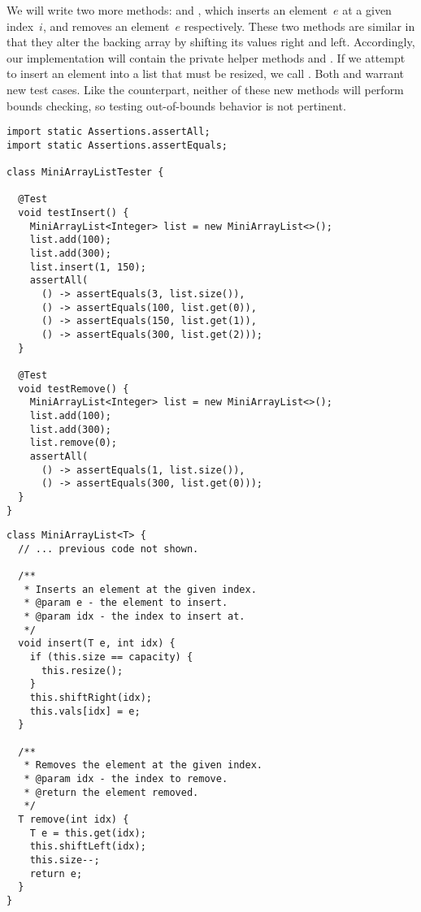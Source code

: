 We will write two more methods:  and , which inserts an element~$e$ at a given index~$i$, and removes an element~$e$ respectively. 
These two methods are similar in that they alter the backing array by shifting its values right and left. 
Accordingly, our implementation will contain the private helper methods  and . 
If we attempt to insert an element into a list that must be resized, we call . 
Both  and  warrant new test cases.
Like the  counterpart, neither of these new methods will perform bounds checking, so testing out-of-bounds behavior is not pertinent.

\begin{lstlisting}[language=MyJava]
import static Assertions.assertAll;
import static Assertions.assertEquals;

class MiniArrayListTester {

  @Test
  void testInsert() {
    MiniArrayList<Integer> list = new MiniArrayList<>();
    list.add(100);
    list.add(300);
    list.insert(1, 150);
    assertAll(
      () -> assertEquals(3, list.size()),
      () -> assertEquals(100, list.get(0)),
      () -> assertEquals(150, list.get(1)),
      () -> assertEquals(300, list.get(2)));
  }

  @Test
  void testRemove() {
    MiniArrayList<Integer> list = new MiniArrayList<>();
    list.add(100);
    list.add(300);
    list.remove(0);
    assertAll(
      () -> assertEquals(1, list.size()),
      () -> assertEquals(300, list.get(0)));
  }
}
\end{lstlisting}

\begin{lstlisting}[language=MyJava]
class MiniArrayList<T> {
  // ... previous code not shown.

  /**
   * Inserts an element at the given index.
   * @param e - the element to insert.
   * @param idx - the index to insert at.
   */
  void insert(T e, int idx) {
    if (this.size == capacity) { 
      this.resize(); 
    }
    this.shiftRight(idx);
    this.vals[idx] = e;
  }

  /**
   * Removes the element at the given index.
   * @param idx - the index to remove.
   * @return the element removed.
   */
  T remove(int idx) {
    T e = this.get(idx);
    this.shiftLeft(idx);
    this.size--;
    return e;
  }
}
\end{lstlisting}

